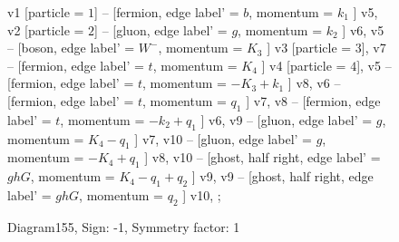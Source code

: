 \documentclass{revtex4}
\begin{document}
\begin{figure}[!htb]
\begin{center}
{    %
v1 [particle = \(1\)] -- [fermion, edge label' = \(b\), momentum = \(k_{1}\) ] v5, 
v2 [particle = \(2\)] -- [gluon, edge label' = \(g\), momentum = \(k_{2}\) ] v6, 
v5 -- [boson, edge label' = \(W^{-}\), momentum = \(K_{3}\) ] v3 [particle = \(3\)], 
v7 -- [fermion, edge label' = \(t\), momentum = \(K_{4}\) ] v4 [particle = \(4\)], 
v5 -- [fermion, edge label' = \(t\), momentum = \(-K_{3} + k_{1}\) ] v8, 
v6 -- [fermion, edge label' = \(t\), momentum = \(q_{1}\) ] v7, 
v8 -- [fermion, edge label' = \(t\), momentum = \(-k_{2} + q_{1}\) ] v6, 
v9 -- [gluon, edge label' = \(g\), momentum = \(K_{4} - q_{1}\) ] v7, 
v10 -- [gluon, edge label' = \(g\), momentum = \(-K_{4} + q_{1}\) ] v8, 
v10 -- [ghost, half right, edge label' = \(ghG\), momentum = \(K_{4} - q_{1} + q_{2}\) ] v9, 
v9 -- [ghost, half right, edge label' = \(ghG\), momentum = \(q_{2}\) ] v10, 
};
\end{center}
\caption{Diagram155, Sign: -1, Symmetry factor: 1}
\end{figure}
\newpage
\end{document}
